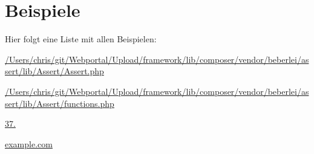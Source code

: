 \section{Beispiele}
Hier folgt eine Liste mit allen Beispielen\+:\begin{DoxyCompactItemize}
\item 
\mbox{\hyperlink{_2_users_2chris_2git_2_webportal_2_upload_2framework_2lib_2composer_2vendor_2beberlei_2assert_2lacf450f68139c1e41d10488936b869cb}{/\+Users/chris/git/\+Webportal/\+Upload/framework/lib/composer/vendor/beberlei/assert/lib/\+Assert/\+Assert.\+php}}
\item 
\mbox{\hyperlink{_2_users_2chris_2git_2_webportal_2_upload_2framework_2lib_2composer_2vendor_2beberlei_2assert_2l71b2cff1f382ea0076479e3e4857df11}{/\+Users/chris/git/\+Webportal/\+Upload/framework/lib/composer/vendor/beberlei/assert/lib/\+Assert/functions.\+php}}
\item 
\mbox{\hyperlink{37_8386013-example}{37.}}
\item 
\mbox{\hyperlink{example_8com-example}{example.\+com}}
\end{DoxyCompactItemize}
